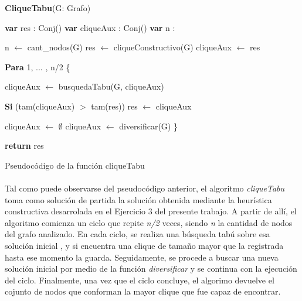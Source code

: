 \footnotesize 
\textbf{CliqueTabu}(G: Grafo) \\
\begin{algorithm}[H]
\linesnumbered
\incmargin{3em}

	\BlankLine
	\textbf{var} res : Conj(\entero)  									
	\textbf{var} cliqueAux : Conj(\entero) 								
	\textbf{var} n : \entero												{}

	\BlankLine \BlankLine
	n $\leftarrow$ cant\_nodos(G)										
	res $\leftarrow$ cliqueConstructivo(G)									
	cliqueAux $\leftarrow$ res											

	\BlankLine \BlankLine
	\textbf{Para} 1, ... , n/2 \{												

	\BlankLine \BlankLine
	\tab cliqueAux $\leftarrow$ busquedaTabu(G, cliqueAux)			

	\BlankLine \BlankLine		
	\tab \textbf{Si} (tam(cliqueAux) $>$ tam(res))						
	\tab \tab	res $\leftarrow$ cliqueAux								

	\BlankLine \BlankLine		
	\tab cliqueAux $\leftarrow$ $\emptyset$							
	\tab cliqueAux $\leftarrow$ diversificar(G)							
	\}
	
	\BlankLine \BlankLine		
	\textbf{return} res													

\caption{Pseudocódigo de la función cliqueTabu}
\end{algorithm}
\normalsize

\paragraph{}
Tal como puede observarse del pseudocódigo anterior, el algoritmo \textit{cliqueTabu} toma como solución de partida la solución obtenida mediante la heurística constructiva desarrolada en el Ejercicio 3 del presente trabajo. A partir de allí, el algoritmo comienza un ciclo que repite \textit{n/2} veces, siendo \textit{n} la cantidad de nodos del grafo analizado. En cada ciclo, se realiza una búsqueda tabú sobre esa solución inicial , y si encuentra una clique de tamaño mayor que la registrada hasta ese momento la guarda. Seguidamente, se procede a buscar una nueva solución inicial por medio de la función \textit{diversificar} y se continua con la ejecución del ciclo. Finalmente, una vez que el ciclo concluye, el algorimo devuelve el cojunto de nodos que conforman la mayor clique que fue capaz de encontrar.

